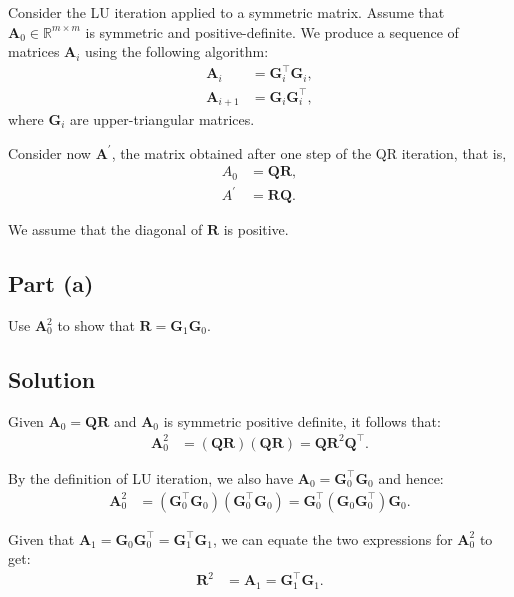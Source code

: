 \documentclass{article}
\begin{document}
Consider the LU iteration applied to a symmetric matrix. Assume that $\mathbf{A}_0 \in \mathbb{R}^{m \times m}$ is symmetric and positive-definite. We produce a sequence of matrices $\mathbf{A}_i$ using the following algorithm:
\begin{align*}
    \mathbf{A}_i &= \mathbf{G}_i^\top \mathbf{G}_i, \\
    \mathbf{A}_{i+1} &= \mathbf{G}_i \mathbf{G}_i^\top,
\end{align*}
where $\mathbf{G}_i$ are upper-triangular matrices.

Consider now $\mathbf{A}^{\prime}$, the matrix obtained after one step of the QR iteration, that is,
\begin{align*}
    A_0 &= \mathbf{Q R}, \\
    A^{\prime} &= \mathbf{R Q}.
\end{align*}

We assume that the diagonal of $\mathbf{R}$ is positive.

\subsection*{Part (a)}

Use $\mathbf{A}_0^2$ to show that $\mathbf{R} = \mathbf{G}_1 \mathbf{G}_0$.

\subsection*{Solution}

Given $\mathbf{A}_0 = \mathbf{Q R}$ and $\mathbf{A}_0$ is symmetric positive definite, it follows that:
\begin{align*}
    \mathbf{A}_0^2 &= (\mathbf{Q R})(\mathbf{Q R}) = \mathbf{Q R}^2 \mathbf{Q}^\top.
\end{align*}

By the definition of LU iteration, we also have $\mathbf{A}_0 = \mathbf{G}_0^\top \mathbf{G}_0$ and hence:
\begin{align*}
    \mathbf{A}_0^2 &= (\mathbf{G}_0^\top \mathbf{G}_0)(\mathbf{G}_0^\top \mathbf{G}_0) = \mathbf{G}_0^\top (\mathbf{G}_0 \mathbf{G}_0^\top) \mathbf{G}_0.
\end{align*}

Given that $\mathbf{A}_1 = \mathbf{G}_0 \mathbf{G}_0^\top = \mathbf{G}_1^\top \mathbf{G}_1$, we can equate the two expressions for $\mathbf{A}_0^2$ to get:
\begin{align*}
    \mathbf{R}^2 &= \mathbf{A}_1 = \mathbf{G}_1^\top \mathbf{G}_1.
\end{align*}
\end{document}
